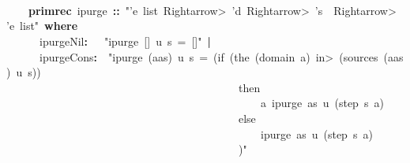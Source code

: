 \documentclass{article}
\newcommand{\syntaxKEYWORDA}[1]{\textcolor[rgb]{0.0,0.4,0.6}{\textbf{#1}}}
\newcommand{\syntaxKEYWORDB}[1]{\textcolor[rgb]{0.0,0.6,0.4}{\textbf{#1}}}
\newcommand{\syntaxLITERALA}[1]{\textcolor[rgb]{1.0,0.0,0.8}{#1}}
\newcommand{\syntaxOPERATOR}[1]{\textcolor[rgb]{0.0,0.0,0.0}{\textbf{#1}}}
\newcommand{\syntaxKEYWORDA}[1]{\textcolor[rgb]{0.0,0.4,0.6}{\textbf{#1}}}
\newcommand{\syntaxKEYWORDB}[1]{\textcolor[rgb]{0.0,0.6,0.4}{\textbf{#1}}}
\newcommand{\syntaxLITERALA}[1]{\textcolor[rgb]{1.0,0.0,0.8}{#1}}
\newcommand{\syntaxOPERATOR}[1]{\textcolor[rgb]{0.0,0.0,0.0}{\textbf{#1}}}
\newcommand{\syntaxKEYWORDA}[1]{\textcolor[rgb]{0.0,0.4,0.6}{\textbf{#1}}}
\newcommand{\syntaxKEYWORDB}[1]{\textcolor[rgb]{0.0,0.6,0.4}{\textbf{#1}}}
\newcommand{\syntaxLITERALA}[1]{\textcolor[rgb]{1.0,0.0,0.8}{#1}}
\newcommand{\syntaxOPERATOR}[1]{\textcolor[rgb]{0.0,0.0,0.0}{\textbf{#1}}}
\newcommand{\syntaxKEYWORDA}[1]{\textcolor[rgb]{0.0,0.4,0.6}{#1}}
\newcommand{\syntaxKEYWORDB}[1]{\textcolor[rgb]{0.0,0.6,0.4}{#1}}
\newcommand{\syntaxLITERALA}[1]{\textcolor[rgb]{1.0,0.0,0.8}{\textbf{#1}}}
\newcommand{\syntaxOPERATOR}[1]{\textcolor[rgb]{0.0,0.0,0.0}{#1}}
\newcommand{\syntaxKEYWORDA}[1]{\textcolor[rgb]{0.0,0.4,0.6}{\textbf{#1}}}
\newcommand{\syntaxKEYWORDB}[1]{\textcolor[rgb]{0.0,0.6,0.4}{\textbf{#1}}}
\newcommand{\syntaxLITERALA}[1]{\textcolor[rgb]{1.0,0.0,0.8}{#1}}
\newcommand{\syntaxOPERATOR}[1]{\textcolor[rgb]{0.0,0.0,0.0}{\textbf{#1}}}
\newcommand{\syntaxKEYWORDA}[1]{\textcolor[rgb]{0.0,0.4,0.6}{\textbf{#1}}}
\newcommand{\syntaxKEYWORDB}[1]{\textcolor[rgb]{0.0,0.6,0.4}{\textbf{#1}}}
\newcommand{\syntaxLITERALA}[1]{\textcolor[rgb]{1.0,0.0,0.8}{#1}}
\newcommand{\syntaxOPERATOR}[1]{\textcolor[rgb]{0.0,0.0,0.0}{\textbf{#1}}}
\begin{document}
\hspace*{\fill}\\
{\ }{\ }{\ }{\ }\hspace*{\fill}\\
{\ }{\ }{\ }{\ }\hspace*{\fill}\\
{\ }{\ }{\ }{\ }\syntaxKEYWORDA{primrec}{\ }ipurge{\ }\syntaxOPERATOR{::}{\ }\syntaxLITERALA{"'e{\ }list{\ }\<Rightarrow>{\ }'d{\ }\<Rightarrow>{\ }'s{\ }{\ }\<Rightarrow>{\ }'e{\ }list"}{\ }\syntaxKEYWORDB{where}\hspace*{\fill}\\
{\ }{\ }{\ }{\ }{\ }{\ }ipurge\usebox{\underscorebox}Nil\syntaxOPERATOR{:}{\ }{\ }{\ }\syntaxLITERALA{"ipurge{\ }{[}{]}{\ }u{\ }s{\ }={\ }{[}{]}"}{\ }\syntaxOPERATOR{|}\hspace*{\fill}\\
{\ }{\ }{\ }{\ }{\ }{\ }ipurge\usebox{\underscorebox}Cons\syntaxOPERATOR{:}{\ }{\ }\syntaxLITERALA{"ipurge{\ }(a\usebox{\hashbox}as){\ }u{\ }s{\ }={\ }(if{\ }(the{\ }(domain{\ }a){\ }\<in>{\ }(sources{\ }(a\usebox{\hashbox}as){\ }u{\ }s))}\hspace*{\fill}\\
\syntaxLITERALA{{\ }{\ }{\ }{\ }{\ }{\ }{\ }{\ }{\ }{\ }{\ }{\ }{\ }{\ }{\ }{\ }{\ }{\ }{\ }{\ }{\ }{\ }{\ }{\ }{\ }{\ }{\ }{\ }{\ }{\ }{\ }{\ }{\ }{\ }{\ }{\ }{\ }{\ }{\ }{\ }{\ }{\ }then}\hspace*{\fill}\\
\syntaxLITERALA{{\ }{\ }{\ }{\ }{\ }{\ }{\ }{\ }{\ }{\ }{\ }{\ }{\ }{\ }{\ }{\ }{\ }{\ }{\ }{\ }{\ }{\ }{\ }{\ }{\ }{\ }{\ }{\ }{\ }{\ }{\ }{\ }{\ }{\ }{\ }{\ }{\ }{\ }{\ }{\ }{\ }{\ }{\ }{\ }{\ }{\ }a{\ }\usebox{\hashbox}{\ }ipurge{\ }as{\ }u{\ }(step{\ }s{\ }a)}\hspace*{\fill}\\
\syntaxLITERALA{{\ }{\ }{\ }{\ }{\ }{\ }{\ }{\ }{\ }{\ }{\ }{\ }{\ }{\ }{\ }{\ }{\ }{\ }{\ }{\ }{\ }{\ }{\ }{\ }{\ }{\ }{\ }{\ }{\ }{\ }{\ }{\ }{\ }{\ }{\ }{\ }{\ }{\ }{\ }{\ }{\ }{\ }else}\hspace*{\fill}\\
\syntaxLITERALA{{\ }{\ }{\ }{\ }{\ }{\ }{\ }{\ }{\ }{\ }{\ }{\ }{\ }{\ }{\ }{\ }{\ }{\ }{\ }{\ }{\ }{\ }{\ }{\ }{\ }{\ }{\ }{\ }{\ }{\ }{\ }{\ }{\ }{\ }{\ }{\ }{\ }{\ }{\ }{\ }{\ }{\ }{\ }{\ }{\ }{\ }ipurge{\ }as{\ }u{\ }(step{\ }s{\ }a)}\hspace*{\fill}\\
\syntaxLITERALA{{\ }{\ }{\ }{\ }{\ }{\ }{\ }{\ }{\ }{\ }{\ }{\ }{\ }{\ }{\ }{\ }{\ }{\ }{\ }{\ }{\ }{\ }{\ }{\ }{\ }{\ }{\ }{\ }{\ }{\ }{\ }{\ }{\ }{\ }{\ }{\ }{\ }{\ }{\ }{\ }{\ }{\ })"}\hspace*{\fill}\\
\end{document}
